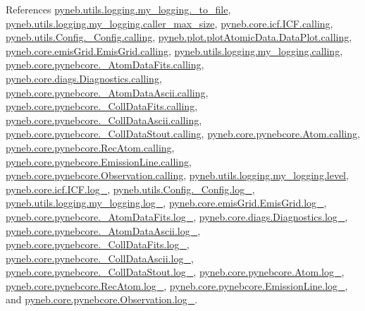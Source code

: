 References \hyperlink{logging_8py_source_l00179}{pyneb.\-utils.\-logging.\-my\-\_\-logging.\-\_\-to\-\_\-file}, \hyperlink{logging_8py_source_l00040}{pyneb.\-utils.\-logging.\-my\-\_\-logging.\-caller\-\_\-max\-\_\-size}, \hyperlink{icf_8py_source_l00016}{pyneb.\-core.\-icf.\-I\-C\-F.\-calling}, \hyperlink{_config_8py_source_l00032}{pyneb.\-utils.\-Config.\-\_\-\-Config.\-calling}, \hyperlink{plot_atomic_data_8py_source_l00042}{pyneb.\-plot.\-plot\-Atomic\-Data.\-Data\-Plot.\-calling}, \hyperlink{emis_grid_8py_source_l00044}{pyneb.\-core.\-emis\-Grid.\-Emis\-Grid.\-calling}, \hyperlink{logging_8py_source_l00044}{pyneb.\-utils.\-logging.\-my\-\_\-logging.\-calling}, \hyperlink{pynebcore_8py_source_l00097}{pyneb.\-core.\-pynebcore.\-\_\-\-Atom\-Data\-Fits.\-calling}, \hyperlink{diags_8py_source_l00169}{pyneb.\-core.\-diags.\-Diagnostics.\-calling}, \hyperlink{pynebcore_8py_source_l00318}{pyneb.\-core.\-pynebcore.\-\_\-\-Atom\-Data\-Ascii.\-calling}, \hyperlink{pynebcore_8py_source_l00585}{pyneb.\-core.\-pynebcore.\-\_\-\-Coll\-Data\-Fits.\-calling}, \hyperlink{pynebcore_8py_source_l00936}{pyneb.\-core.\-pynebcore.\-\_\-\-Coll\-Data\-Ascii.\-calling}, \hyperlink{pynebcore_8py_source_l01156}{pyneb.\-core.\-pynebcore.\-\_\-\-Coll\-Data\-Stout.\-calling}, \hyperlink{pynebcore_8py_source_l01229}{pyneb.\-core.\-pynebcore.\-Atom.\-calling}, \hyperlink{pynebcore_8py_source_l02643}{pyneb.\-core.\-pynebcore.\-Rec\-Atom.\-calling}, \hyperlink{pynebcore_8py_source_l03385}{pyneb.\-core.\-pynebcore.\-Emission\-Line.\-calling}, \hyperlink{pynebcore_8py_source_l03541}{pyneb.\-core.\-pynebcore.\-Observation.\-calling}, \hyperlink{logging_8py_source_l00041}{pyneb.\-utils.\-logging.\-my\-\_\-logging.\-level}, \hyperlink{icf_8py_source_l00015}{pyneb.\-core.\-icf.\-I\-C\-F.\-log\-\_\-}, \hyperlink{_config_8py_source_l00031}{pyneb.\-utils.\-Config.\-\_\-\-Config.\-log\-\_\-}, \hyperlink{logging_8py_source_l00033}{pyneb.\-utils.\-logging.\-my\-\_\-logging.\-log\-\_\-}, \hyperlink{emis_grid_8py_source_l00043}{pyneb.\-core.\-emis\-Grid.\-Emis\-Grid.\-log\-\_\-}, \hyperlink{pynebcore_8py_source_l00087}{pyneb.\-core.\-pynebcore.\-\_\-\-Atom\-Data\-Fits.\-log\-\_\-}, \hyperlink{diags_8py_source_l00168}{pyneb.\-core.\-diags.\-Diagnostics.\-log\-\_\-}, \hyperlink{pynebcore_8py_source_l00308}{pyneb.\-core.\-pynebcore.\-\_\-\-Atom\-Data\-Ascii.\-log\-\_\-}, \hyperlink{pynebcore_8py_source_l00574}{pyneb.\-core.\-pynebcore.\-\_\-\-Coll\-Data\-Fits.\-log\-\_\-}, \hyperlink{pynebcore_8py_source_l00923}{pyneb.\-core.\-pynebcore.\-\_\-\-Coll\-Data\-Ascii.\-log\-\_\-}, \hyperlink{pynebcore_8py_source_l01155}{pyneb.\-core.\-pynebcore.\-\_\-\-Coll\-Data\-Stout.\-log\-\_\-}, \hyperlink{pynebcore_8py_source_l01216}{pyneb.\-core.\-pynebcore.\-Atom.\-log\-\_\-}, \hyperlink{pynebcore_8py_source_l02633}{pyneb.\-core.\-pynebcore.\-Rec\-Atom.\-log\-\_\-}, \hyperlink{pynebcore_8py_source_l03384}{pyneb.\-core.\-pynebcore.\-Emission\-Line.\-log\-\_\-}, and \hyperlink{pynebcore_8py_source_l03540}{pyneb.\-core.\-pynebcore.\-Observation.\-log\-\_\-}.



